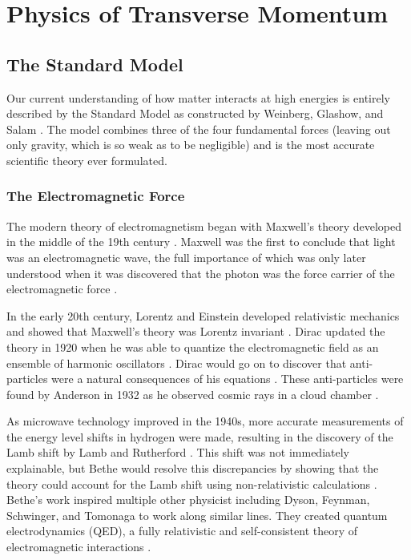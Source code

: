 \chapter{Physics of \texorpdfstring{\Z}{Z} Transverse Momentum}
\label{chapter:theory}

\section{The Standard Model}
\label{section:standard_model}

Our current understanding of how matter interacts at high energies is entirely
described by the Standard Model as constructed by Weinberg, Glashow, and
Salam \cite{glashow1961}\cite{weinberg1967}\cite{salam1968}. The model combines
three of the four fundamental forces (leaving out only gravity, which is so
weak as to be negligible) and is the most accurate scientific theory ever
formulated.

\subsection{The Electromagnetic Force}
\label{subsection:electronmagnetic_force}

The modern theory of electromagnetism began with Maxwell's theory developed in
the middle of the 19th century \cite{maxwell1873}. Maxwell was the first to
conclude that light was an electromagnetic wave, the full importance of which
was only later understood when it was discovered that the photon was the force
carrier of the electromagnetic force \cite{maxwell1865}.

In the early 20th century, Lorentz and Einstein developed relativistic
mechanics and showed that Maxwell's theory was Lorentz invariant
\cite{lorentz1899}\cite{einstein1904}. Dirac updated the theory in 1920 when he
was able to quantize the electromagnetic field as an ensemble of harmonic
oscillators \cite{dirac1927}. Dirac would go on to discover that anti-particles
were a natural consequences of his equations \cite{dirac1928}\cite{dirac1930}.
These anti-particles were found by Anderson in 1932 as he observed cosmic rays
in a cloud chamber \cite{anderson1933}.

As microwave technology improved in the 1940s, more accurate measurements of
the energy level shifts in hydrogen were made, resulting in the discovery of
the Lamb shift by Lamb and Rutherford \cite{lamb1947}. This shift was not
immediately explainable, but Bethe would resolve this discrepancies by showing
that the theory could account for the Lamb shift using non-relativistic
calculations \cite{bethe1947}. Bethe's work inspired multiple other physicist
including Dyson, Feynman, Schwinger, and Tomonaga to work along similar lines.
They created quantum electrodynamics (QED), a fully relativistic and
self-consistent theory of electromagnetic interactions
\cite{tomonaga1946}\cite{schwinger1948}\cite{feynman1949}\cite{dyson1949}.

